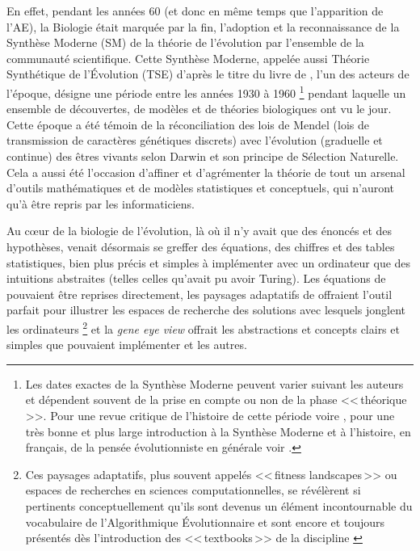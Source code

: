 En effet, pendant les années 60 (et donc en même temps que l'apparition de l'AE), la Biologie était marquée par la fin, l'adoption et la reconnaissance de la Synthèse Moderne (SM) de la théorie de l'évolution par l'ensemble de la communauté scientifique. Cette Synthèse Moderne, appelée aussi Théorie Synthétique de l'Évolution (TSE) d'après le titre du livre de \citet{huxley1942evolution}, l'un des acteurs de l'époque, désigne une période entre les années 1930 à 1960 \footnote{Les dates exactes de la Synthèse Moderne peuvent varier suivant les auteurs et dépendent souvent de la prise en compte ou non de la phase <<\,théorique\,>>. Pour une revue critique de l'histoire de cette période voire \citep{reif00synthetictheoryevolutiongeneralproblemsgermancontributiontosynthesis}, pour une très bonne et plus large introduction à la Synthèse Moderne et à l'histoire, en français, de la pensée évolutionniste en générale voir \cite{gayon1991darwinetlapresdarwin}.} pendant laquelle un ensemble de découvertes, de modèles et de théories biologiques ont vu le jour. Cette époque a été témoin de la réconciliation des lois de Mendel (lois de transmission de caractères génétiques discrets) avec l'évolution (graduelle et continue) des êtres vivants selon Darwin et son principe de Sélection Naturelle. Cela a aussi été l'occasion d'affiner et d'agrémenter la théorie de tout un arsenal d'outils mathématiques et de modèles statistiques et conceptuels, qui n'auront qu'à être repris par les informaticiens.

Au c\oe ur de la biologie de l'évolution, là où il n'y avait que des énoncés et des hypothèses, venait désormais se greffer des équations, des chiffres et des tables statistiques, bien plus précis et simples à implémenter avec un ordinateur que des intuitions abstraites (telles celles qu'avait pu avoir Turing). Les équations de \citet{fisher1930geneticaltheorynaturalselection} pouvaient être reprises directement, les paysages adaptatifs de \cite{wrights1932rolesmutationinbreedingcrossbreedingandselectioninevolution} offraient l'outil parfait pour illustrer les espaces de recherche des solutions avec lesquels jonglent les ordinateurs \footnote{Ces paysages adaptatifs, plus souvent appelés <<\,fitness landscapes\,>> ou espaces de recherches en sciences computationnelles, se révélèrent si pertinents conceptuellement qu'ils sont devenus un élément incontournable du vocabulaire de l'Algorithmique Évolutionnaire et sont encore et toujours présentés dès l'introduction des <<\,textbooks\,>> de la discipline \citep[p. 12]{eiben03introductiontoevolutionarycomputing}} et la \emph{gene eye view} offrait les abstractions et concepts clairs et simples que pouvaient implémenter \cite{holland75adaptationnaturalartificialsystem} et les autres.


